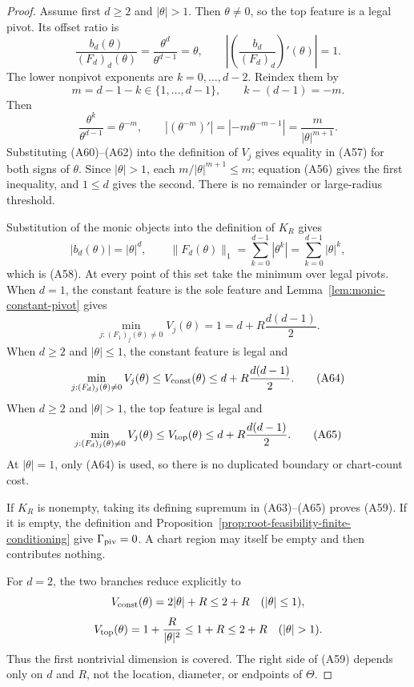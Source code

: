 \begin{proof}
Assume first $d\geq2$ and $|\theta|>1$.  Then $\theta\neq0$, so the top
feature is a legal pivot.  Its offset ratio is
\[
\frac{b_d(\theta)}{(F_d)_d(\theta)}
=\frac{\theta^d}{\theta^{d-1}}=\theta,
\qquad
\left|\left(\frac{b_d}{(F_d)_d}\right)'(\theta)\right|=1.
\tag{A60}
\]
The lower nonpivot exponents are $k=0,\ldots,d-2$.  Reindex them by
\[
m=d-1-k\in\{1,\ldots,d-1\},
\qquad k-(d-1)=-m.
\tag{A61}
\]
Then
\[
\frac{\theta^k}{\theta^{d-1}}=\theta^{-m},
\qquad
| (\theta^{-m})' |
=|-m\theta^{-m-1}|
=\frac{m}{|\theta|^{m+1}}.
\tag{A62}
\]
Substituting \textup{(A60)}--\textup{(A62)} into the definition of $V_j$
gives equality in \textup{(A57)} for both signs of $\theta$.  Since
$|\theta|>1$, each $m/|\theta|^{m+1}\leq m$; equation \textup{(A56)}
gives the first inequality, and $1\leq d$ gives the second.  There is no
remainder or large-radius threshold.

Substitution of the monic objects into the definition of $K_R$ gives
\[
|b_d(\theta)|=|\theta|^d,
\qquad
\|F_d(\theta)\|_1
=\sum_{k=0}^{d-1}|\theta^k|
=\sum_{k=0}^{d-1}|\theta|^k,
\]
which is \textup{(A58)}.  At every point of this set take the minimum over
legal pivots.  When $d=1$, the constant feature is the sole feature and
Lemma~\ref{lem:monic-constant-pivot} gives
\[
\min_{j:(F_1)_j(\theta)\neq0}V_j(\theta)
=1=d+R\frac{d(d-1)}2.
\tag{A63}
\]
When $d\geq2$ and $|\theta|\leq1$, the constant feature is legal and
\[
\min_{j:(F_d)_j(\theta)\neq0}V_j(\theta)
\leq V_{\rm const}(\theta)
\leq d+R\frac{d(d-1)}2.
\tag{A64}
\]
When $d\geq2$ and $|\theta|>1$, the top feature is legal and
\[
\min_{j:(F_d)_j(\theta)\neq0}V_j(\theta)
\leq V_{\rm top}(\theta)
\leq d+R\frac{d(d-1)}2.
\tag{A65}
\]
At $|\theta|=1$, only \textup{(A64)} is used, so there is no duplicated
boundary or chart-count cost.

If $K_R$ is nonempty, taking its defining supremum in
\textup{(A63)}--\textup{(A65)} proves \textup{(A59)}.  If it is empty,
the definition and Proposition~\ref{prop:root-feasibility-finite-conditioning}
give $\Gamma_{\rm piv}=0$.  A chart region may itself be empty and then
contributes nothing.

For $d=2$, the two branches reduce explicitly to
\[
V_{\rm const}(\theta)=2|\theta|+R\leq2+R
\quad(|\theta|\leq1),
\]
\[
V_{\rm top}(\theta)=1+\frac R{|\theta|^2}
\leq1+R\leq2+R
\quad(|\theta|>1).
\]
Thus the first nontrivial dimension is covered.  The right side of
\textup{(A59)} depends only on $d$ and $R$, not the location, diameter, or
endpoints of $\Theta$.
\end{proof}

